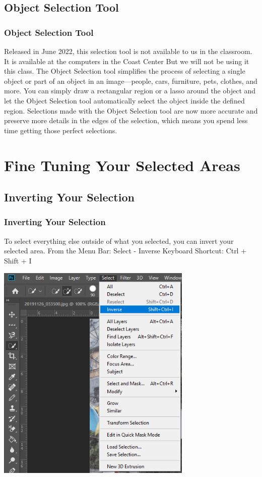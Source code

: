 \documentclass{beamer}
\begin{document}
\subsection{Object Selection Tool}
\begin{frame}
	\frametitle{Object Selection Tool}
	\begin{outline}
		\1 Released in June 2022, this selection tool is not available to us in the classroom.
		\1 It is available at the computers in the Coast Center
		\2 But we will not be using it this class.  
		\1 The Object Selection tool simplifies the process of selecting a single object or part of an object in an image—people, cars, furniture, pets, clothes, and more. You can simply draw a rectangular region or a lasso around the object and let the Object Selection tool automatically select the object inside the defined region. Selections made with the Object Selection tool are now more accurate and preserve more details in the edges of the selection, which means you spend less time getting those perfect selections.
	\end{outline}
\end{frame}

\section{Fine Tuning Your Selected Areas}
\subsection{Inverting Your Selection}
\begin{frame}
	\frametitle{Inverting Your Selection}
	\begin{outline}
		\1 To select everything else outside of what you selected, you can invert your selected area.
		\1 From the Menu Bar:  Select - Inverse
		\1 Keyboard Shortcut:  Ctrl + Shift + I
	\end{outline}
	\begin{center}
		\includegraphics[width = 0.7\textwidth]{images/invert selection.png}
	\end{center}
\end{frame}
\end{document}
